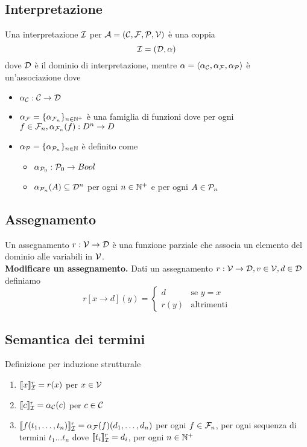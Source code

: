 \documentclass{article}
\begin{document}
\subsection*{Interpretazione}
Una interpretazione \(\mathcal{I}\) per \(\mathcal{A} = (\mathcal{C, F, P, V})\) è una coppia
\[\mathcal{I} = (\mathcal{D}, \alpha)\]
dove \(\mathcal{D}\) è il dominio di interpretazione, mentre \(\alpha = \langle \alpha_{\mathcal{C}},\alpha_{\mathcal{F}},\alpha_{\mathcal{P}} \rangle\) è un'associazione dove
\begin{itemize}
    \item \(\alpha_{\mathcal{C}}: \mathcal{C} \rightarrow \mathcal{D}\)
    \item \(\alpha_{\mathcal{F}} = \{\alpha_{\mathcal{F}_n}\}_{n \in \mathbb{N}^+}\) è una famiglia di funzioni dove per ogni \(f \in \mathcal{F}_n, \alpha_{\mathcal{F}_n}(f): D^n \rightarrow D\)
    \item \(\alpha_{\mathcal{P}} = \{\alpha_{\mathcal{P}_n}\}_{n \in \mathbb{N}}\) è definito come
    \begin{itemize}
        \item \(\alpha_{\mathcal{P}_0}: \mathcal{P}_0 \rightarrow Bool\)
        \item \(\alpha_{\mathcal{P}_n}(A) \subseteq \mathcal{D}^n\) per ogni \(n \in \mathbb{N}^+\) e per ogni \(A \in \mathcal{P}_n\)
    \end{itemize}
\end{itemize}
\subsection*{Assegnamento}
Un assegnamento \(r: \mathcal{V} \rightarrow \mathcal{D}\) è una funzione parziale che associa un elemento del dominio alle variabili in \(\mathcal{V}\). \\
\textbf{Modificare un assegnamento. } Dati un assegnamento \(r: \mathcal{V} \rightarrow \mathcal{D}, v \in \mathcal{V}, d \in \mathcal{D}\) definiamo
\[
    r[x \rightarrow d](y) =
    \begin{cases}
        d & \text{se } y = x \\
        r(y) & \text{altrimenti}
    \end{cases}
\]
\subsection*{Semantica dei termini}
Definizione per induzione strutturale
\begin{enumerate}
    \item \(\llbracket x \rrbracket_{\mathcal{I}}^r = r(x)\) per \(x \in \mathcal{V}\)
    \item \(\llbracket c \rrbracket_{\mathcal{I}}^r = \alpha_{\mathcal{C}}(c)\) per \(c \in \mathcal{C}\)
    \item \(\llbracket f(t_1, \ldots, t_n) \rrbracket_{\mathcal{I}}^r = \alpha_{\mathcal{F}}(f)(d_1, \ldots, d_n)\) per ogni \(f \in \mathcal{F}_n\), per ogni sequenza di termini \(t_1 \ldots t_n\) dove \(\llbracket t_i \rrbracket_{\mathcal{I}}^r = d_i\), per ogni \(n \in \mathbb{N}^+\)
\end{enumerate}
\end{document}
